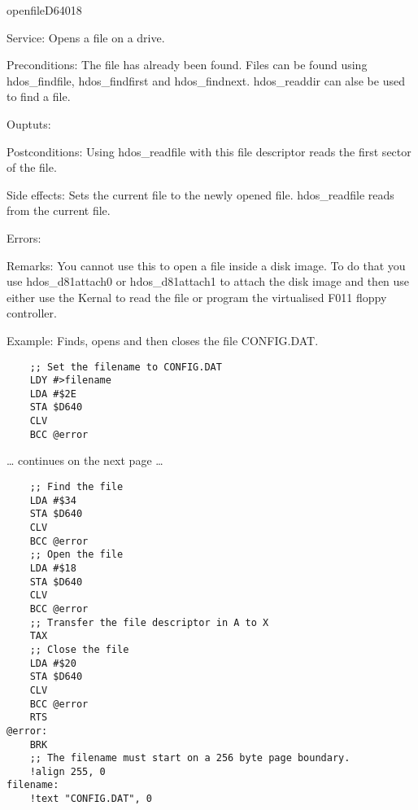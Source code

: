 \newpage
\begin{hyppotrap}{openfile}{D640}{18}
\item [Service:]
  Opens a file on a drive.
\item [Preconditions:]
  The file has already been found. Files can be found using hdos\_findfile,
  hdos\_findfirst and hdos\_findnext. hdos\_readdir can alse be used to find a
  file.
\item [Ouptuts:]
\item [Postconditions:]
  Using hdos\_readfile with this file descriptor reads the first sector of the
  file.
\item [Side effects:]
  Sets the current file to the newly opened file. hdos\_readfile reads from the
  current file.
\item [Errors:]
\item [Remarks:]
  You cannot use this to open a file inside a disk image. To do that you use
  hdos\_d81attach0 or hdos\_d81attach1 to attach the disk image and then use
  either use the Kernal to read the file or program the virtualised F011 floppy
  controller.
\item [Example:]
  Finds, opens and then closes the file CONFIG.DAT.

\begin{tcolorbox}[colback=black,coltext=white]
\verbatimfont{\codefont}
\begin{verbatim}
    ;; Set the filename to CONFIG.DAT
    LDY #>filename
    LDA #$2E
    STA $D640
    CLV
    BCC @error
\end{verbatim}
\end{tcolorbox}

\ldots{} continues on the next page \ldots

\begin{tcolorbox}[colback=black,coltext=white]
\verbatimfont{\codefont}
\begin{verbatim}
    ;; Find the file
    LDA #$34
    STA $D640
    CLV
    BCC @error
    ;; Open the file
    LDA #$18
    STA $D640
    CLV
    BCC @error
    ;; Transfer the file descriptor in A to X
    TAX
    ;; Close the file
    LDA #$20
    STA $D640
    CLV
    BCC @error
    RTS
@error:
    BRK
    ;; The filename must start on a 256 byte page boundary.
    !align 255, 0
filename:
    !text "CONFIG.DAT", 0
\end{verbatim}
\end{tcolorbox}
\end{hyppotrap}


